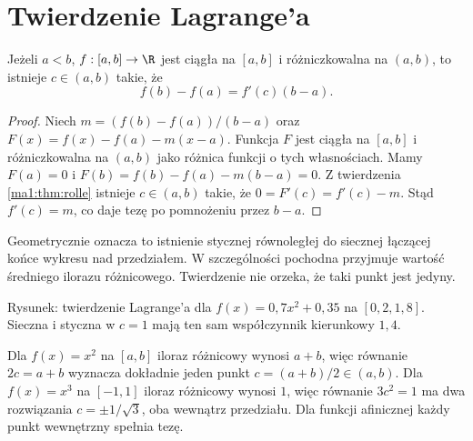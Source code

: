 \section{Twierdzenie Lagrange'a}
\begin{twierdzenie}
\label{ma1:thm:lagrange}
Jeżeli $a<b$, $f:[a,b]\to\R$ jest ciągła na $[a,b]$ i różniczkowalna na $(a,b)$, to istnieje $c\in(a,b)$ takie, że
\[
 f(b)-f(a)=f'(c)(b-a).
\]
\end{twierdzenie}
\begin{proof}
Niech $m=(f(b)-f(a))/(b-a)$ oraz $F(x)=f(x)-f(a)-m(x-a)$. Funkcja $F$ jest ciągła na $[a,b]$ i różniczkowalna na $(a,b)$ jako różnica funkcji o tych własnościach. Mamy $F(a)=0$ i $F(b)=f(b)-f(a)-m(b-a)=0$. Z twierdzenia \ref{ma1:thm:rolle} istnieje $c\in(a,b)$ takie, że $0=F'(c)=f'(c)-m$. Stąd $f'(c)=m$, co daje tezę po pomnożeniu przez $b-a$.
\end{proof}
Geometrycznie oznacza to istnienie stycznej równoległej do siecznej łączącej końce wykresu nad przedziałem. W szczególności pochodna przyjmuje wartość średniego ilorazu różnicowego. Twierdzenie nie orzeka, że taki punkt jest jedyny.
\begin{center}

\small Rysunek: twierdzenie Lagrange'a dla $f(x)=0{,}7x^2+0{,}35$ na $[0{,}2,1{,}8]$. Sieczna i styczna w $c=1$ mają ten sam współczynnik kierunkowy $1{,}4$.
\end{center}
\begin{przyklad}
\label{ma1:ex:lagrange-witnesses}
Dla $f(x)=x^2$ na $[a,b]$ iloraz różnicowy wynosi $a+b$, więc równanie $2c=a+b$ wyznacza dokładnie jeden punkt $c=(a+b)/2\in(a,b)$. Dla $f(x)=x^3$ na $[-1,1]$ iloraz różnicowy wynosi $1$, więc równanie $3c^2=1$ ma dwa rozwiązania $c=\pm1/\sqrt3$, oba wewnątrz przedziału. Dla funkcji afinicznej każdy punkt wewnętrzny spełnia tezę.
\end{przyklad}

